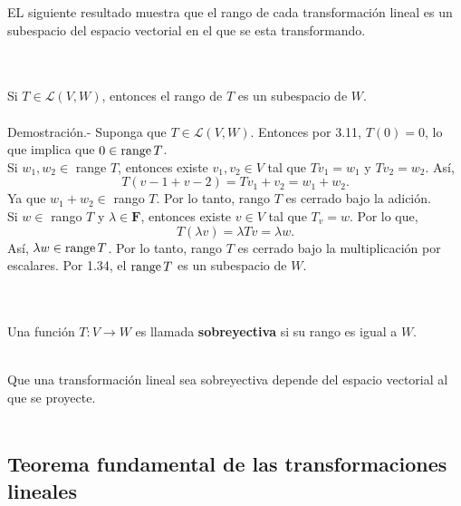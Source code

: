 EL siguiente resultado muestra que el rango de cada transformación lineal es un subespacio del espacio vectorial en el que se esta transformando.

\setcounter{myteo}{18}
\begin{myteo}\,\\\\
    Si $T\in \mathcal{L}(V,W)$, entonces el rango de $T$ es un subespacio de $W$.\\\\
	Demostración.-\; Suponga que $T\in \mathcal{L}(V,W)$. Entonces por 3.11, $T(0)=0$, lo que implica que $0\in \operatorname{range} T$.\\
	Si $w_1,w_2\in$ range $T$, entonces existe $v_1,v_2\in V$ tal que $Tv_1=w_1$ y $Tv_2=w_2$. Así,
	$$T(v-1+v-2)=Tv_1+v_2=w_1+w_2.$$
	Ya que $w_1+w_2\in$ rango $T$. Por lo tanto, rango $T$ es cerrado bajo la adición.\\
	Si $w\in$ rango $T$ y $\lambda\in \textbf{F}$, entonces existe $v\in V$ tal que $T_v=w$.
	Por lo que, 
	$$T(\lambda v)=\lambda Tv=\lambda w.$$
	Así, $\lambda w\in \operatorname{range} T$. Por lo tanto, rango $T$ es cerrado bajo la multiplicación por escalares. Por 1.34, el  $\operatorname{range} T$ es un subespacio de $W$.
\end{myteo}

\begin{mydef}[Sobreyectiva]\,\\\\
	Una función $T:V\to W$ es llamada \textbf{sobreyectiva} si su rango es igual a $W$.\\\\
\end{mydef}

Que una transformación lineal sea sobreyectiva depende del espacio vectorial al que se proyecte.\\\\


\subsection*{Teorema fundamental de las transformaciones lineales}

